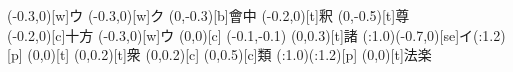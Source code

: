 \documentclass[m_shidai]{subfiles}
\begin{document}
\HUGE
\noindent
{\qyu%
\aki\aki\tsuya{\s}%
\kaigyo[2]\tsuya{\q}\moji(-0.3,0)[w]{ウ}%
\aki\aki\tsuya{\q}\moji(-0.3,0)[w]{ク}}%
\karifu(0,-0.3)[b]{會中}
{\iro{\q}\lwoo%
\iro{\c}\sho{}}%
   {\chikara{\s}\cii\矢[n]%
    \kak\矢[s]\modori\kak\長[n]}%
\newline\hfill
{}
   {\chikara{\s}\tsuya{\q}
   \aki{}\tsuyamochi{\q}\lwoo}
\karifu(-0.2,0)[t]{釈}{\chikara{\lw}}%
\karifu(0,-0.5)[t]{尊}{%
   \uchitsuke{\q}\tsuya{\q}}\\[5truemm]
\karifu(-0.2,0)[c]{十方}{\chikara{\lw}\tsu%
   \aki{\q}\tsuyamochi{\q}\moji(-0.3,0)[w]{ウ}\sho}
\karifu(0,0)[c]{}
{\qyu\moveTo(-0.1,-0.1)\iro{\c}\sho
{}\iro{\c}\sho\tsuya{\q}}
\karifu(0,0.3)[t]{諸}
  {\tsuya{\q}\ooyu{\q}\kili[e]
   \base(\s:1.0)\moji(-0.7,0)[se]{イ}\modori*(\w:1.2)[p]\orisute
   \iro{\k}\sho\iro[2]{\k}\sho}
\karifu(0,0)[t]{}
    {\uchitsuke{\q}\tsuya{\q}\aki\tsuya{\q}}
\newline
\karifu(0,0.2)[t]{衆}{\iro{\c}\chikara{\s}\tsuya{\q}}
\karifu(0,0.2)[c]{}{\tsuya{\q}}
\karifu(0,0.5)[c]{類}{\tsuya{\q}}
{\tsuya{\q}%
\ooyu{\q}\kili[se]\base(\s:1.0)\modori*(\w:1.2)[p]\orisute\iro{\k}\sho\iro[2]{\k}\sho}%
\karifu(0,0)[t]{法楽}
{\uchitsuke{\q}\tsuya{\q}
\aki\tsuya{\q}}
\end{document}
